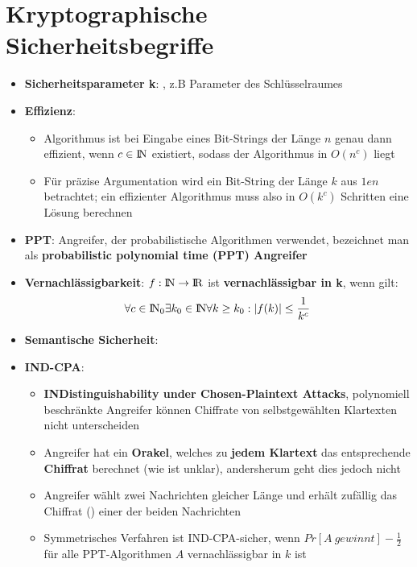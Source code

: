 \section{Kryptographische Sicherheitsbegriffe}%
\label{kseb:sec:kryptographische_sicherheitsbegriffe}

\begin{itemize}
	\item \textbf{Sicherheitsparameter k}: , z.B Parameter des Schlüsselraumes
	\item \textbf{Effizienz}:
	\begin{itemize}
		\item Algorithmus ist bei Eingabe eines Bit-Strings der Länge $n$ genau dann effizient, wenn $c \in {\rm I\!N}$ existiert, sodass der Algorithmus in $O(n^c)$ liegt
		\item Für präzise Argumentation wird ein Bit-String der Länge $k$ aus $1en$ betrachtet; ein effizienter Algorithmus muss also in $O(k^c)$ Schritten eine Lösung berechnen
	\end{itemize}
	\item \textbf{PPT}: Angreifer, der probabilistische Algorithmen verwendet, bezeichnet man als \textbf{probabilistic polynomial time (PPT) Angreifer}
	\item \textbf{Vernachlässigbarkeit}: $f: {\rm I\!N} \rightarrow {\rm I\!R}$ ist \textbf{vernachlässigbar in k}, wenn gilt:
	$$
		\forall c \in {\rm I\!N}_0 \exists k_0 \in {\rm I\!N} \forall k \geq k_0: |f(k)| \leq \frac{1}{k^c}
	$$
	\item \textbf{Semantische Sicherheit}: 
	\item \textbf{IND-CPA}:
	\begin{itemize}
		\item \textbf{INDistinguishability under Chosen-Plaintext Attacks}, polynomiell beschränkte Angreifer können Chiffrate von selbstgewählten Klartexten nicht unterscheiden
		\item Angreifer hat ein \textbf{Orakel}, welches zu \textbf{jedem Klartext} das entsprechende \textbf{Chiffrat} berechnet (wie ist unklar), andersherum geht dies jedoch nicht
		\item Angreifer wählt zwei Nachrichten gleicher Länge und erhält zufällig das Chiffrat () einer der beiden Nachrichten
		\item Symmetrisches Verfahren ist IND-CPA-sicher, wenn $Pr[A\ gewinnt] - \frac{1}{2}$ für alle PPT-Algorithmen $A$ vernachlässigbar in $k$ ist

\end{itemize}
\end{itemize}
